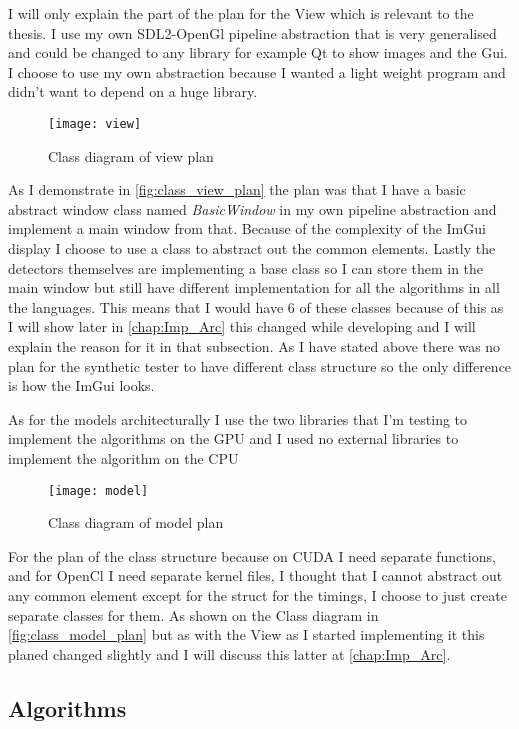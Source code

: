 I will only explain the part of the plan for the View which is relevant to the thesis. I use my own \ac{SDL2}-OpenGl pipeline abstraction that is very generalised and could be changed to any library for example Qt to show images and the Gui. I choose to use my own abstraction because I wanted a light weight program and didn't want to depend on a huge library. 

\begin{figure}[H]
\centering
\texttt{[image: view]}
\caption{Class diagram of view plan}
\label{fig:class_view_plan}
\end{figure}

As I demonstrate in \autoref{fig:class_view_plan} the plan was that I have a basic abstract window class named \textit{BasicWindow} in my own pipeline abstraction and implement a main window from that. Because of the complexity of the ImGui display I choose to use a class to abstract out the common elements. Lastly the detectors themselves are implementing a base class so I can store them in the main window but still have different implementation for all the algorithms in all the languages. This means that I would have 6 of these classes because of this as I will show later in \autoref{chap:Imp_Arc} this changed while developing and I will explain the reason for it in that subsection. As I have stated above there was no plan for the synthetic tester to have different class structure so the only difference is how the ImGui looks.

As for the models architecturally I use the two libraries that I'm testing to implement the algorithms on the \ac{GPU} and I used no external libraries to implement the algorithm on the \ac{CPU}

\begin{figure}[H]
\centering
\texttt{[image: model]}
\caption{Class diagram of model plan}
\label{fig:class_model_plan}
\end{figure}

For the plan of the class structure because on CUDA I need separate functions, and for OpenCl I need separate kernel files, I thought that I cannot abstract out any common element except for the struct for the timings, I choose to just create separate classes for them. As shown on the Class diagram in \autoref{fig:class_model_plan} but as with the View as I started implementing it this planed changed slightly and I will discuss this latter at \autoref{chap:Imp_Arc}.

\subsection{Algorithms}
\label{chap:algo}

